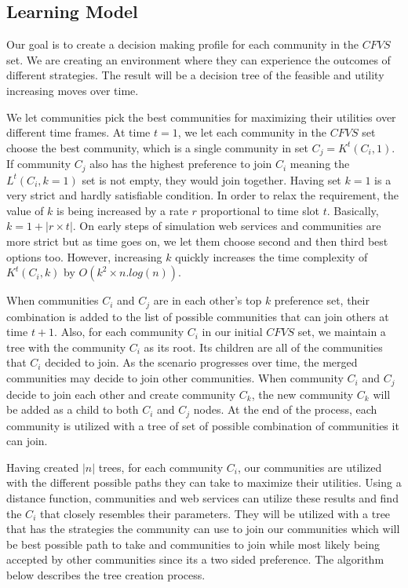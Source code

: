 \documentclass[10pt,journal,cspaper,compsoc]{IEEEtran}
\begin{document}
\subsection{Learning Model}\label{ss:learningmodel}

Our goal is to create a decision making profile for each community in the $CFVS$ set. We are creating an environment where they can experience the outcomes of different strategies. The result will be a decision tree of the feasible and utility increasing moves over time.

We let communities pick the best communities for maximizing their utilities over different time frames. At time $t = 1$, we let each community in the $CFVS$ set choose the best community, which is a single community in set $C_j = K^t(C_i, 1)$. If community $C_j$ also has the highest preference to join $C_i$ meaning the $L^t(C_i, k=1)$ set is not empty, they would join together. Having set $k = 1$ is a very strict and hardly satisfiable condition. In order to relax the requirement, the value of $k$ is being increased by a rate $r$ proportional to time slot $t$. Basically, $k = 1 + |r \times t|$. On early steps of simulation web services and communities are more strict but as time goes on, we let them choose second and then third best options too. However, increasing $k$ quickly increases the time complexity of $K^t(C_i, k)$ by $O(k^2 \times n.log(n))$. 

When communities $C_i$ and $C_j$ are in each other's top $k$ preference set, their combination is added to the list of possible communities that can join others at time $t+1$. Also, for each community $C_i$ in our initial $CFVS$ set, we maintain a tree with the community $C_i$ as its root. Its children are all of the communities that $C_i$ decided to join. As the scenario progresses over time, the merged communities may decide to join other communities. When community $C_i$ and $C_j$ decide to join each other and create community $C_k$, the new community $C_k$ will be added as a child to both $C_i$ and $C_j$ nodes. At the end of the process, each community is utilized with a tree of set of possible combination of communities it can join.

Having created $|n|$ trees, for each community $C_i$, our communities are utilized with the different possible paths they can take to maximize their utilities. Using a distance function, communities and web services can utilize these results and find the $C_i$ that closely resembles their parameters. They will be utilized with a tree that has the strategies the community can use to join our communities which will be best possible path to take and communities to join while most likely being accepted by other communities since its a two sided preference. The algorithm below describes the tree creation process.
\end{document}
